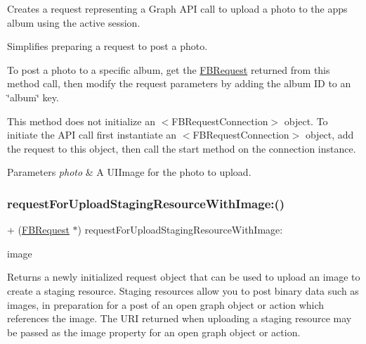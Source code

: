 Creates a request representing a Graph A\+PI call to upload a photo to the app\textquotesingle{}s album using the active session.

Simplifies preparing a request to post a photo.

To post a photo to a specific album, get the {\ttfamily \hyperlink{interfaceFBRequest}{F\+B\+Request}} returned from this method call, then modify the request parameters by adding the album ID to an \char`\"{}album\char`\"{} key.

This method does not initialize an $<$\+F\+B\+Request\+Connection$>$ object. To initiate the A\+PI call first instantiate an $<$\+F\+B\+Request\+Connection$>$ object, add the request to this object, then call the {\ttfamily start} method on the connection instance.


\begin{DoxyParams}{Parameters}
{\em photo} & A {\ttfamily U\+I\+Image} for the photo to upload. \\
\hline
\end{DoxyParams}
\mbox{\label{interfaceFBRequest_a4a85038bef70a9edd91a56ab0db0bfd6}} 
\subsubsection{\texorpdfstring{request\+For\+Upload\+Staging\+Resource\+With\+Image\+:()}{requestForUploadStagingResourceWithImage:()}\hspace{0.1cm}{\footnotesize\ttfamily [1/5]}}
{\footnotesize\ttfamily + (\hyperlink{interfaceFBRequest}{F\+B\+Request} $\ast$) request\+For\+Upload\+Staging\+Resource\+With\+Image\+: \begin{DoxyParamCaption}\item[{(U\+I\+Image $\ast$)}]{image }\end{DoxyParamCaption}}

Returns a newly initialized request object that can be used to upload an image to create a staging resource. Staging resources allow you to post binary data such as images, in preparation for a post of an open graph object or action which references the image. The U\+RI returned when uploading a staging resource may be passed as the image property for an open graph object or action.

